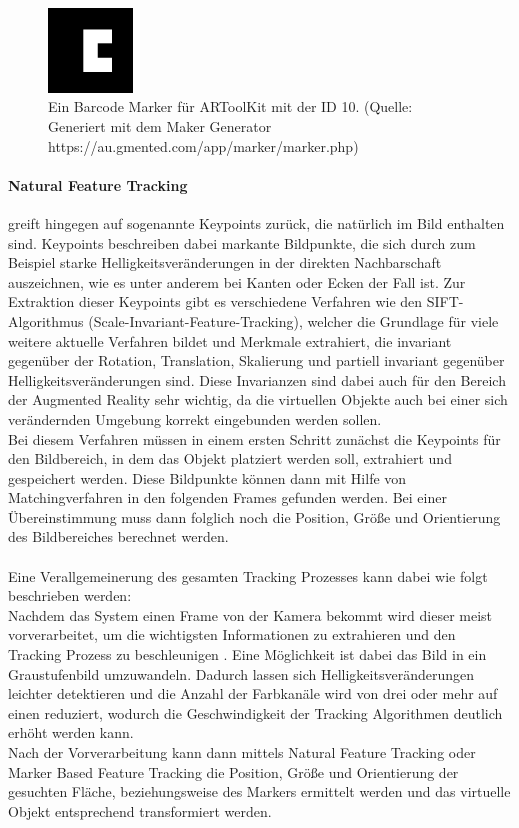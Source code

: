 \begin{figure}[h!]
\centering
\includegraphics[width=0.2\textwidth]{Abbildungen/BarcodeMarker3x3-10.png}
\caption[Barcode Marker]{Ein Barcode Marker für ARToolKit mit der ID 10. (Quelle: Generiert mit dem  Maker Generator https://au.gmented.com/app/marker/marker.php)}
\label{fig:barcode-marker}
\end{figure}


\paragraph{Natural Feature Tracking} greift hingegen auf sogenannte Keypoints zurück, die natürlich im Bild enthalten sind. Keypoints beschreiben dabei markante Bildpunkte, die sich durch zum Beispiel starke Helligkeitsveränderungen in der direkten Nachbarschaft auszeichnen, wie es unter anderem bei Kanten oder Ecken der Fall ist. Zur Extraktion dieser Keypoints gibt es verschiedene Verfahren wie den SIFT-Algorithmus (Scale-Invariant-Feature-Tracking),  welcher die Grundlage für viele weitere aktuelle Verfahren bildet und Merkmale extrahiert, die invariant gegenüber der Rotation, Translation, Skalierung und partiell invariant gegenüber Helligkeitsveränderungen sind\citep[S. 345]{nischwitz:bildverarbeitung}. Diese Invarianzen sind dabei auch für den Bereich der Augmented Reality sehr wichtig, da die virtuellen Objekte auch bei einer sich verändernden Umgebung korrekt eingebunden werden sollen.\\
Bei diesem Verfahren müssen in einem ersten Schritt zunächst die Keypoints für den Bildbereich, in dem das Objekt platziert werden soll, extrahiert und gespeichert werden. Diese Bildpunkte können dann mit Hilfe von Matchingverfahren in den folgenden Frames gefunden werden. Bei einer Übereinstimmung muss dann folglich noch die Position, Größe und Orientierung des Bildbereiches berechnet werden. \\
\\
Eine Verallgemeinerung des gesamten Tracking Prozesses kann dabei wie folgt beschrieben werden:\\
Nachdem das System einen Frame von der Kamera bekommt wird dieser meist vorverarbeitet, um die wichtigsten Informationen zu extrahieren und den Tracking Prozess zu beschleunigen \citep[S. 5]{cukovic:marker-vs-natural}. Eine Möglichkeit ist dabei das Bild in ein Graustufenbild umzuwandeln. Dadurch lassen sich Helligkeitsveränderungen leichter detektieren und die Anzahl der Farbkanäle wird von drei oder mehr auf einen reduziert, wodurch die Geschwindigkeit der Tracking Algorithmen deutlich erhöht werden kann.\\
Nach der Vorverarbeitung kann dann mittels Natural Feature Tracking oder Marker Based Feature Tracking die Position, Größe und Orientierung der gesuchten Fläche, beziehungsweise des Markers ermittelt werden und das virtuelle Objekt entsprechend transformiert werden.

